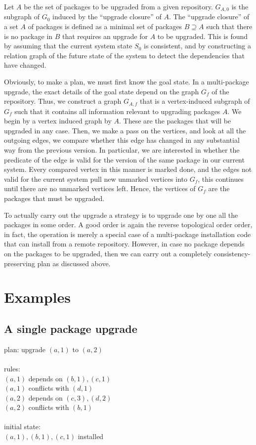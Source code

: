 \documentclass[a4paper,11pt]{article}
\begin{document}
Let $A$ be the set of packages to be upgraded from a given repository.
$G_{A,0}$ is the subgraph of $G_{0}$ induced by the ``upgrade
closure'' of $A$. The ``upgrade closure'' of a set $A$ of packages is
defined as a minimal set of packages $B \supseteq A$ such that there is no
package in $B$ that requires an upgrade for $A$ to be upgraded. This
is found by assuming that the current system state $S_0$ is
consistent, and by constructing a relation graph of the future state
of the system to detect the dependencies that have changed.

Obviously, to make a plan, we must first know the goal state. In a
multi-package upgrade, the exact details of the goal state depend on
the graph $G_f$ of the repository. Thus, we construct a graph
$G_{A,f}$ that is a vertex-induced subgraph of $G_f$ such that it
contains all information relevant to upgrading packages $A$. We begin
by a vertex induced graph by $A$. These are the packages that will be
upgraded in any case. Then, we make a pass on the vertices, and look
at all the outgoing edges, we compare whether this edge has changed in
any substantial way from the previous version. In particular, we are
interested in whether the predicate of the edge is valid for the
version of the same package in our current system. Every compared
vertex in this manner is marked done, and the edges not valid for the
current system pull new unmarked vertices into $G_f$, this continues
until there are no unmarked vertices left. Hence, the vertices of
$G_f$ are the packages that must be upgraded. 

To actually carry out the upgrade a strategy is to upgrade one by one
all the packages in some order. A good order is again the reverse
topological order order, in fact, the operation is merely a special case of a
multi-package installation code that can install from a remote
repository. However, in case no package depends on the packages to be
upgraded, then we can carry out a completely consistency-preserving
plan as discussed above.

\section{Examples}

\subsection{A single package upgrade}

plan: upgrade $(a,1)$ to $(a,2)$\\
\\
rules:\\
  $(a,1)$ depends on $(b,1), (c,1)$ \\
  $(a,1)$ conflicts with $(d,1)$\\
  $(a,2)$ depends on $(c,3), (d,2)$\\
  $(a,2)$ conflicts with $(b,1)$\\
\\
initial state:\\
  $(a,1), (b,1), (c,1)$ installed \\
\end{document}
